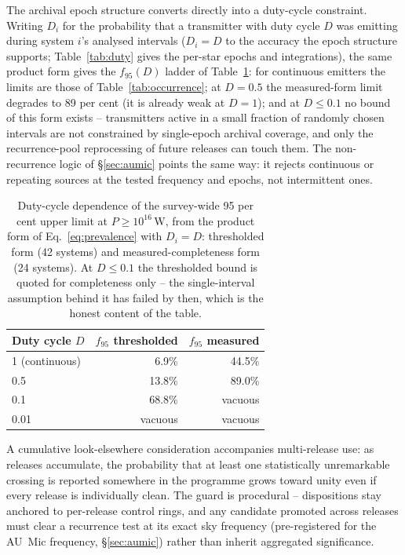 \documentclass{openjournal}
\begin{document}
The archival epoch structure converts directly into a duty-cycle
constraint. Writing $D_i$ for the probability that a transmitter with
duty cycle $D$ was emitting during system $i$'s analysed intervals
($D_i=D$ to the accuracy the epoch structure supports; Table~\ref{tab:duty}
gives the per-star epochs and integrations), the same product form
gives the $f_{95}(D)$ ladder of Table~\ref{tab:f95duty}: for
continuous emitters the limits are those of Table~\ref{tab:occurrence};
at $D=0.5$ the measured-form limit degrades to 89 per cent (it is
already weak at $D=1$); and at $D\leq0.1$ no bound of this form exists
-- transmitters active in a small fraction of randomly chosen
intervals are not constrained by single-epoch archival coverage, and
only the recurrence-pool reprocessing of future releases can touch
them. The non-recurrence logic of \S\ref{sec:aumic} points the same
way: it rejects continuous or repeating sources at the tested
frequency and epochs, not intermittent ones.

\begin{table}
\centering
\small
\caption{Duty-cycle dependence of the survey-wide 95 per cent upper
limit at $P\geq10^{16}$\,W, from the product form of
Eq.~\ref{eq:prevalence} with $D_i=D$: thresholded form (42 systems)
and measured-completeness form (24 systems). At $D\leq0.1$ the
thresholded bound is quoted for completeness only -- the
single-interval assumption behind it has failed by then, which is the
honest content of the table.}
\label{tab:f95duty}
\begin{tabular}{@{}lrr@{}}
\toprule
Duty cycle $D$ & $f_{95}$ thresholded & $f_{95}$ measured \\
\midrule
1 (continuous) & 6.9\% & 44.5\% \\
0.5 & 13.8\% & 89.0\% \\
0.1 & 68.8\% & vacuous \\
0.01 & vacuous & vacuous \\
\bottomrule
\end{tabular}
\end{table}

A cumulative look-elsewhere consideration accompanies multi-release
use: as releases accumulate, the probability that at least one
statistically unremarkable crossing is reported somewhere in the
programme grows toward unity even if every release is individually
clean. The guard is procedural -- dispositions stay anchored to
per-release control rings, and any candidate promoted across releases
must clear a recurrence test at its exact sky frequency
(pre-registered for the AU~Mic frequency, \S\ref{sec:aumic}) rather
than inherit aggregated significance.
\end{document}
